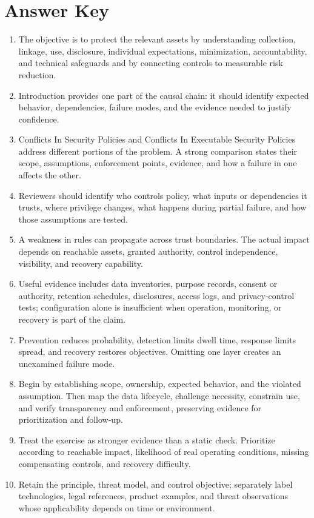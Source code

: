\documentclass[11pt,letterpaper]{article}
\begin{document}
\section*{Answer Key}
\begin{enumerate}
\item The objective is to protect the relevant assets by understanding collection, linkage, use, disclosure, individual expectations, minimization, accountability, and technical safeguards and by connecting controls to measurable risk reduction.
\item Introduction provides one part of the causal chain: it should identify expected behavior, dependencies, failure modes, and the evidence needed to justify confidence.
\item Conflicts In Security Policies and Conflicts In Executable Security Policies address different portions of the problem. A strong comparison states their scope, assumptions, enforcement points, evidence, and how a failure in one affects the other.
\item Reviewers should identify who controls policy, what inputs or dependencies it trusts, where privilege changes, what happens during partial failure, and how those assumptions are tested.
\item A weakness in rules can propagate across trust boundaries. The actual impact depends on reachable assets, granted authority, control independence, visibility, and recovery capability.
\item Useful evidence includes data inventories, purpose records, consent or authority, retention schedules, disclosures, access logs, and privacy-control tests; configuration alone is insufficient when operation, monitoring, or recovery is part of the claim.
\item Prevention reduces probability, detection limits dwell time, response limits spread, and recovery restores objectives. Omitting one layer creates an unexamined failure mode.
\item Begin by establishing scope, ownership, expected behavior, and the violated assumption. Then map the data lifecycle, challenge necessity, constrain use, and verify transparency and enforcement, preserving evidence for prioritization and follow-up.
\item Treat the exercise as stronger evidence than a static check. Prioritize according to reachable impact, likelihood of real operating conditions, missing compensating controls, and recovery difficulty.
\item Retain the principle, threat model, and control objective; separately label technologies, legal references, product examples, and threat observations whose applicability depends on time or environment.
\end{enumerate}
\end{document}
